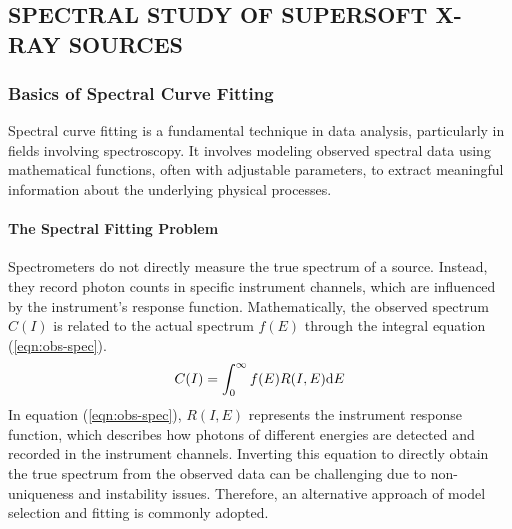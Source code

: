 \chapter{\MakeUppercase{\ChapterTitleTwo}} \label{chap:methodology}
    \minitoc
    
    
    \setcounter{footnote}{\value{footnotecount}}
    
    \newpage
    \section{\MakeUppercase{Spectral Study of Supersoft X-ray Sources}} \label{methodology:spectral}
    	
    	\subsection{Basics of Spectral Curve Fitting}
    		Spectral curve fitting is a fundamental technique in data analysis, particularly in fields involving spectroscopy. It involves modeling observed spectral data using mathematical functions, often with adjustable parameters, to extract meaningful information about the underlying physical processes.

			\subsubsection{The Spectral Fitting Problem}
				Spectrometers do not directly measure the true spectrum of a source. Instead, they record photon counts in specific instrument channels, which are influenced by the instrument's response function. Mathematically, the observed spectrum $C(I)$ is related to the actual spectrum $f(E)$ through the integral equation (\ref{eqn:obs-spec}).
				\begin{align}
					C(I)=\int_0^\infty{f(E)R(I,E)\mathrm{d}E} \label{eqn:obs-spec}
				\end{align}
				In equation (\ref{eqn:obs-spec}), $R(I,E)$ represents the instrument response function, which describes how photons of different energies are detected and recorded in the instrument channels. Inverting this equation to directly obtain the true spectrum from the observed data can be challenging due to non-uniqueness and instability issues. Therefore, an alternative approach of model selection and fitting is commonly adopted.
			
